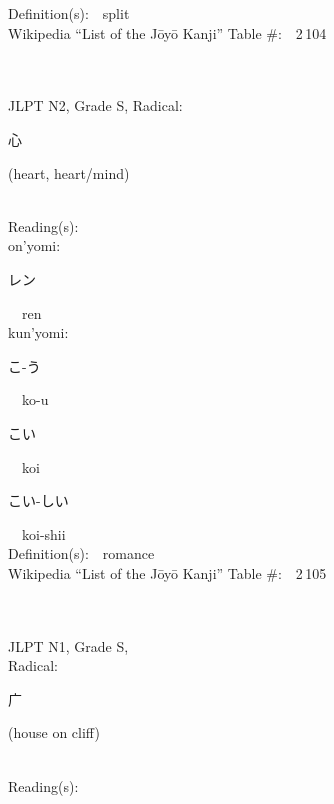 \begin{multicols}{2}
Definition(s):\ \ split \\
Wikipedia ``List of the J\=oy\=o Kanji'' Table \#:\ \ 2\,104 \\
\ \ \\
{\fontsize{34pt}{40pt}  }\ \ \\  %
{JLPT N2, Grade S, Radical:\ \ {\begin{CJK}{UTF8}{min} 心 \end{CJK}} (heart, heart/mind) } \\
Reading(s):\ \ \\
{\hspace*{1em}}on'yomi:\ \ \\
{\hspace*{2em}}{\begin{CJK}{UTF8}{min} レン \end{CJK}}\ \ ren\ \ \\
{\hspace*{1em}}kun'yomi:\ \ \\
{\hspace*{2em}}{\begin{CJK}{UTF8}{min} こ-う \end{CJK}}\ \ ko-u\ \ \\
{\hspace*{2em}}{\begin{CJK}{UTF8}{min} こい \end{CJK}}\ \ koi\ \ \\
{\hspace*{2em}}{\begin{CJK}{UTF8}{min} こい-しい \end{CJK}}\ \ koi-shii\ \ \\
Definition(s):\ \ romance \\
Wikipedia ``List of the J\=oy\=o Kanji'' Table \#:\ \ 2\,105 \\
\ \ \\
{\fontsize{34pt}{40pt}  }\ \ \\
{JLPT N1, Grade S, \\Radical:\ \ {\begin{CJK}{UTF8}{min} 广 \end{CJK}} (house on cliff) } \\
Reading(s):\ \ \\

\end{multicols}
